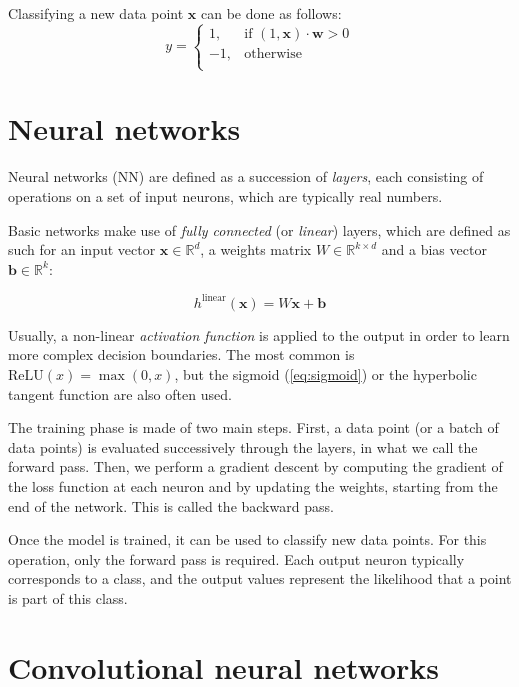 \documentclass[a4paper,11pt,oneside]{report}
\begin{document}
Classifying a new data point $\mathbf{x}$ can be done as follows:
\begin{equation}\label{eq:logistic_reg_pred}
    y = 
    \begin{cases}
        1, & \text{if } (1, \mathbf{x}) \cdot \mathbf{w} > 0 \\
        -1, & \text{otherwise} \\
    \end{cases}
\end{equation}

\section{Neural networks}

Neural networks (NN) are defined as a succession of \emph{layers}, each consisting of operations on a set of input neurons, which are typically real numbers.

Basic networks make use of \emph{fully connected} (or \emph{linear}) layers, which are defined as such for an input vector $\mathbf{x} \in \mathbb{R}^d$, a weights matrix $W \in \mathbb{R}^{k \times d}$ and a bias vector $\mathbf{b} \in \mathbb{R}^k$:

\begin{equation}\label{eq:linear_layer}
    h^{\mathrm{linear}}(\mathbf{x}) = W \mathbf{x} + \mathbf{b}
\end{equation}

Usually, a non-linear \emph{activation function} is applied to the output in order to learn more complex decision boundaries. 
The most common is $\mathrm{ReLU}(x) = \max(0, x)$, but the sigmoid (\autoref{eq:sigmoid}) or the hyperbolic tangent function are also often used.

The training phase is made of two main steps. 
First, a data point (or a batch of data points) is evaluated successively through the layers, in what we call the forward pass. 
Then, we perform a gradient descent by computing the gradient of the loss function at each neuron and by updating the weights, starting from the end of the network. 
This is called the backward pass.

Once the model is trained, it can be used to classify new data points. 
For this operation, only the forward pass is required.
Each output neuron typically corresponds to a class, and the output values represent the likelihood that a point is part of this class.

\section{Convolutional neural networks}
\end{document}

